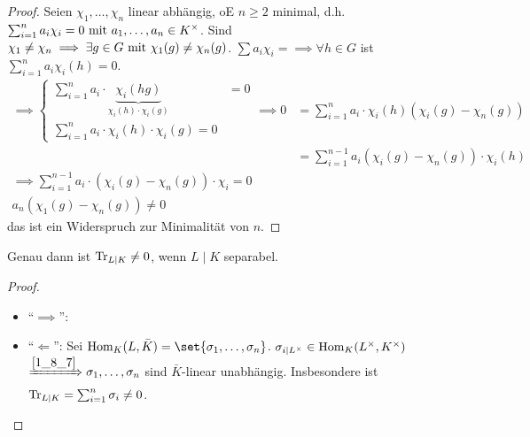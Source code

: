 \begin{proof} %
	Seien $\chi_1, \dots, \chi_n$ linear abhängig, oE $n \ge 2$ minimal, d.h. $\sum_{i=1}^n a_i \chi_i = 0 \mit a_1, \dots, a_n \in K^{\times}$. Sind $\chi_1 \neq \chi_n \implies \exists g \in G \mit \chi_1(g) \neq \chi_n(g)$. $\sum a_i \chi_i = \implies \forall h \in G$ ist $\sum_{i=1}^n a_i \chi_i (h) = 0$.
	\begin{align*}
		\implies \begin{cases}
			\sum_{i=1}^n a_i \cdot \underbrace{\chi_i (hg)}_{\chi_i(h)\cdot \chi_i(g)} &= 0\\
			\sum_{i=1}^n a_i \cdot \chi_i(h)\cdot \chi_i(g) = 0
		\end{cases}
		\implies 0 &= \sum_{i=1}^n a_i \cdot \chi_i(h)(\chi_i(g) - \chi_n(g))\\
		&= \sum_{i=1}^{n-1} a_i (\chi_i(g) - \chi_n(g))\cdot \chi_i(h)\\
		\implies \sum_{i=1}^{n-1} a_i \cdot (\chi_i(g) - \chi_n(g))\cdot \chi_i = 0\\
		a_n (\chi_1(g) - \chi_n(g)) \neq 0
	\end{align*}
	das ist ein Widerspruch zur Minimalität von $n$.
\end{proof}
\begin{conclusion}
	Genau dann ist $\Tr_{L \mid K} \neq 0$, wenn $L \mid K$ separabel.
\end{conclusion}
\begin{proof}\
	\begin{itemize}
		\item ``$\implies$'': 
		\item ``$\Longleftarrow$'': Sei $\Hom_K(L, \bar{K}) = \set{\sigma_1, \dots, \sigma_n}$. $\sigma_{i \mid L^{\times}} \in \Hom_K(L^{\times}, K^{\times})$\\
		$\xRightarrow{\cref{1_8_7}} \sigma_1,\dots, \sigma_n$ sind $\bar{K}$-linear unabhängig. Insbesondere ist $\Tr_{L \mid K} = \sum_{i=1}^n \sigma_i \neq 0$.
	\end{itemize}
\end{proof}